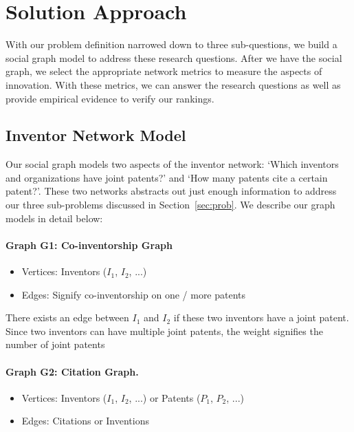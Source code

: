 \section{Solution Approach}
\label{sec:sol}
With our problem definition narrowed down to three sub-questions, we build a social graph model to address these research questions. 
After we have the social graph, we select the appropriate network metrics to measure the aspects of innovation.
With these metrics, we can answer the research questions as well as provide empirical evidence to verify our rankings.

\subsection{Inventor Network Model}
\label{sec:model}
Our social graph models two aspects of the inventor network:  `Which inventors
and organizations have joint patents?' and `How many patents cite a certain
patent?'. These two networks abstracts out just enough information to address
our three sub-problems discussed in Section~\ref{sec:prob}. We describe our graph models in detail below:

\paragraph{Graph G1: Co-inventorship Graph}

	\begin{itemize}
	\squish
		\item {Vertices:} Inventors  ($I_1$, $I_2$, ...)
		\item {Edges:} Signify co-inventorship on one / more patents
	\end{itemize}

There exists an edge between $I_1$ and $I_2$ if these two inventors have a
joint patent. Since two inventors can have multiple joint patents, the weight
signifies the number of joint patents

\paragraph{Graph G2: Citation Graph.}

	\begin{itemize}
	\squish
		\item {Vertices:} Inventors ($I_1$, $I_2$, ...) or Patents ($P_1$, $P_2$, ...)
		\item {Edges:} Citations or Inventions
	\end{itemize}

